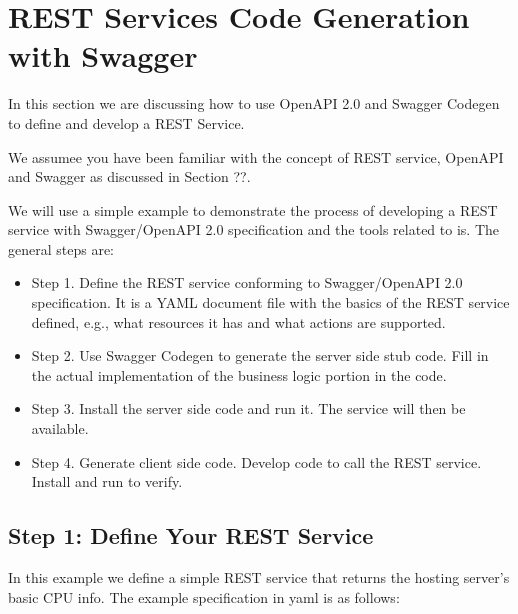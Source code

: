 \hypertarget{rest-services-code-generation-with-swagger}{%
\section{REST Services Code Generation with
Swagger}\label{rest-services-code-generation-with-swagger}}

In this section we are discussing how to use OpenAPI 2.0 and Swagger
Codegen to define and develop a REST Service.

We assumee you have been familiar with the concept of REST service,
OpenAPI and Swagger as discussed in Section ??.

We will use a simple example to demonstrate the process of developing a
REST service with Swagger/OpenAPI 2.0 specification and the tools
related to is. The general steps are:

\begin{itemize}
\tightlist
\item
  Step 1. Define the REST service conforming to Swagger/OpenAPI 2.0
  specification. It is a YAML document file with the basics of the REST
  service defined, e.g., what resources it has and what actions are
  supported.
\item
  Step 2. Use Swagger Codegen to generate the server side stub code.
  Fill in the actual implementation of the business logic portion in the
  code.
\item
  Step 3. Install the server side code and run it. The service will then
  be available.
\item
  Step 4. Generate client side code. Develop code to call the REST
  service. Install and run to verify.
\end{itemize}

\hypertarget{step-1-define-your-rest-service}{%
\subsection{Step 1: Define Your REST
Service}\label{step-1-define-your-rest-service}}

In this example we define a simple REST service that returns the hosting
server's basic CPU info. The example specification in yaml is as
follows:

